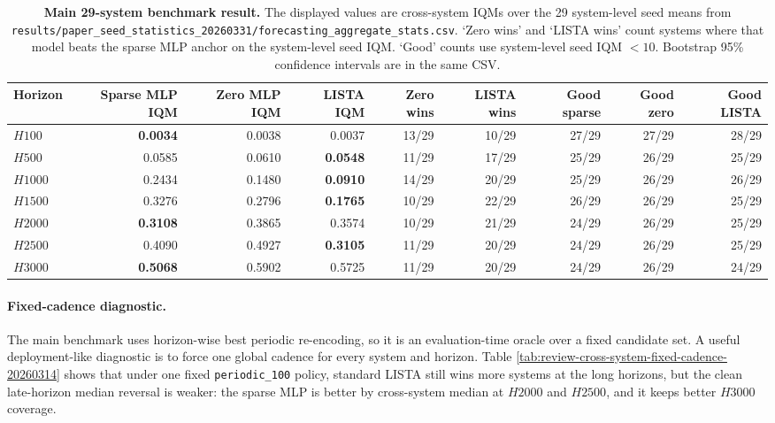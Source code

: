 \begin{table}[ht]
\centering
\scriptsize
\setlength{\tabcolsep}{5pt}
\begin{tabular}{lrrrrrrrr}
\toprule
Horizon & Sparse MLP IQM & Zero MLP IQM & LISTA IQM & Zero wins & LISTA wins & Good sparse & Good zero & Good LISTA \\
\midrule
$H100$  & \textbf{0.0034} & 0.0038 & 0.0037 & 13/29 & 10/29 & 27/29 & 27/29 & 28/29 \\
$H500$  & 0.0585 & 0.0610 & \textbf{0.0548} & 11/29 & 17/29 & 25/29 & 26/29 & 25/29 \\
$H1000$ & 0.2434 & 0.1480 & \textbf{0.0910} & 14/29 & 20/29 & 25/29 & 26/29 & 26/29 \\
$H1500$ & 0.3276 & 0.2796 & \textbf{0.1765} & 10/29 & 22/29 & 26/29 & 26/29 & 25/29 \\
$H2000$ & \textbf{0.3108} & 0.3865 & 0.3574 & 10/29 & 21/29 & 24/29 & 26/29 & 25/29 \\
$H2500$ & 0.4090 & 0.4927 & \textbf{0.3105} & 11/29 & 20/29 & 24/29 & 26/29 & 25/29 \\
$H3000$ & \textbf{0.5068} & 0.5902 & 0.5725 & 11/29 & 20/29 & 24/29 & 26/29 & 24/29 \\
\bottomrule
\end{tabular}
\caption{\textbf{Main 29-system benchmark result.} The displayed values are cross-system IQMs over the 29 system-level seed means from \texttt{results/paper\_seed\_statistics\_20260331/forecasting\_aggregate\_stats.csv}. `Zero wins' and `LISTA wins' count systems where that model beats the sparse MLP anchor on the system-level seed IQM. `Good' counts use system-level seed IQM $< 10$. Bootstrap 95\% confidence intervals are in the same CSV.}
\label{tab:review-cross-system-main-20260314}
\end{table}


\paragraph{Fixed-cadence diagnostic.}
The main benchmark uses horizon-wise best periodic re-encoding, so it is an
evaluation-time oracle over a fixed candidate set. A useful deployment-like
diagnostic is to force one global cadence for every system and horizon. Table
\ref{tab:review-cross-system-fixed-cadence-20260314} shows that under one fixed
\texttt{periodic\_100} policy, standard LISTA still wins more systems at the long
horizons, but the clean late-horizon median reversal is weaker: the sparse MLP
is better by cross-system median at $H2000$ and $H2500$, and it keeps better
$H3000$ coverage.

